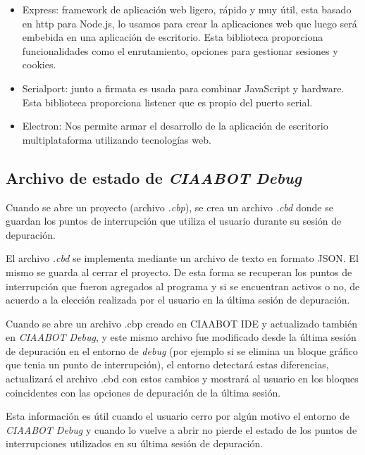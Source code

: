 \begin{itemize}
	\item Express\citep{express}:  framework de aplicación web ligero, rápido y muy útil, esta basado en http para Node.js, lo usamos para crear la aplicaciones web que luego será embebida en una aplicación de escritorio. Esta biblioteca  proporciona funcionalidades como el enrutamiento, opciones para gestionar sesiones y cookies.
	
	\item Serialport\citep{serialport}: junto a firmata es usada para combinar JavaScript y hardware. Esta biblioteca proporciona listener que es propio del puerto serial.
	
	\item Electron\citep{electron}: Nos permite armar el desarrollo de la aplicación de escritorio multiplataforma utilizando tecnologías web.
\end{itemize}


\subsection{Archivo de estado de \emph{CIAABOT Debug}}
\label{subsec:Archivo de CIAABOT Debug}

Cuando se abre un proyecto (archivo \emph{.cbp}), se crea un archivo \emph{.cbd} donde se guardan los puntos de interrupción que utiliza el usuario durante su sesión de depuración.

El archivo \emph{.cbd} se implementa mediante un archivo de texto en formato JSON\citep{json}. El mismo se guarda al cerrar el proyecto. De esta forma se recuperan los puntos de interrupción que fueron agregados al programa
y si se encuentran activos o no, de acuerdo a la elección realizada por el usuario en la última sesión de depuración. 

Cuando se abre un archivo .cbp creado en CIAABOT IDE y actualizado también en \emph{CIAABOT Debug}, y este mismo archivo fue modificado desde la última sesión de depuración en el entorno de \emph{debug} (por ejemplo si se elimina un bloque gráfico que tenia un punto de interrupción), el entorno detectará estas diferencias, actualizará el archivo .cbd con estos cambios y mostrará al usuario en los bloques coincidentes con las opciones de depuración de la última sesión.

Esta información es útil cuando el usuario cerro por algún motivo el entorno de \emph{CIAABOT Debug} y cuando lo vuelve a abrir no pierde el estado de los puntos de interrupciones utilizados en su última sesión de depuración.

